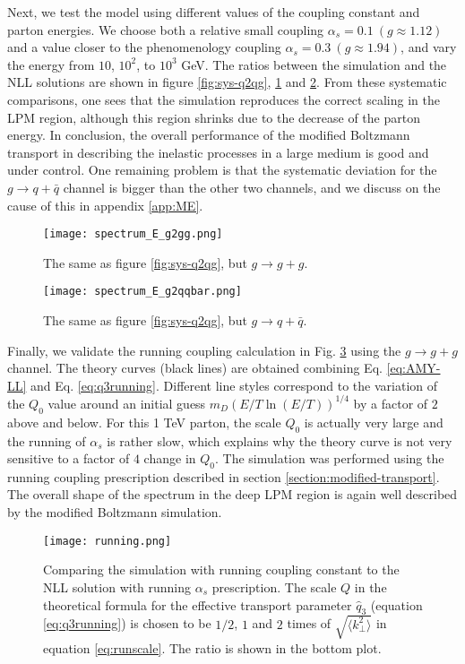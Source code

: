 Next, we test the model using different values of the coupling constant and parton energies.
We choose both a relative small coupling $\alpha_s = 0.1~(g \approx 1.12)$ and a value closer to the phenomenology coupling $\alpha_s = 0.3~(g \approx 1.94)$, and vary the energy from $10$, $10^2$, to $10^3$ GeV.
The ratios between the simulation and the NLL solutions are shown in figure \ref{fig:sys-q2qg}, \ref{fig:sys-g2gg} and \ref{fig:sys-g2qqbar}.
From these systematic comparisons,
one sees that the simulation reproduces the correct scaling in the LPM region, although this region shrinks due to the decrease of the parton energy.
In conclusion, the overall performance of the modified Boltzmann transport in describing the inelastic processes in a large medium is good and under control.
One remaining problem is that the systematic deviation for the $g\rightarrow q+\bar{q}$ channel is bigger than the other two channels, and we discuss on the cause of this in appendix \ref{app:ME}.

\begin{figure}
\singlespacing
\centering
\texttt{[image: spectrum\_E\_g2gg.png]}
\caption{The same as figure \ref{fig:sys-q2qg}, but $g \rightarrow g + g$.}
\label{fig:sys-g2gg}
\end{figure}

\begin{figure}
\singlespacing
\centering
\texttt{[image: spectrum\_E\_g2qqbar.png]}
\caption{The same as figure \ref{fig:sys-q2qg}, but $g \rightarrow q + \bar{q}$.}
\label{fig:sys-g2qqbar}
\end{figure}

Finally, we validate the running coupling calculation in Fig. \ref{fig:running} using the $g\rightarrow g+g$ channel.
The theory curves (black lines) are obtained combining Eq. \ref{eq:AMY-LL} and Eq. \ref{eq:q3running}.
Different line styles correspond to the variation of the $Q_0$ value around an initial guess $m_D (E/T \ln(E/T) )^{1/4}$ by a factor of $2$ above and below.
For this 1 TeV parton, the scale $Q_0$ is actually very large and the running of $\alpha_s$ is rather slow, which explains why the theory curve is not very sensitive to a factor of $4$ change in $Q_0$.
The simulation was performed using the running coupling prescription described in section \ref{section:modified-transport}.
The overall shape of the spectrum in the deep LPM region is again well described by the modified Boltzmann simulation. 

\begin{figure}
\singlespacing
\centering
\texttt{[image: running.png]}
\caption[Comparing the simulation with running coupling constant to]{Comparing the simulation with running coupling constant to the NLL solution with running $\alpha_s$ prescription.
The scale $Q$ in the theoretical formula for the effective transport parameter $\hat{q}_3$ (equation \ref{eq:q3running}) is chosen to be $1/2$, $1$ and $2$ times of $\sqrt{\langle k_\perp^2\rangle}$ in equation \ref{eq:runscale}.
The ratio is shown in the bottom plot.}
\label{fig:running}
\end{figure}


